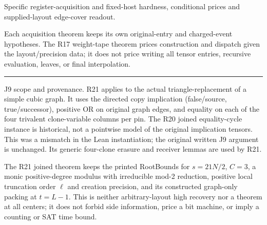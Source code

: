 \documentclass[11pt,a4paper]{article}
\newlength{\OfflineResearchTableWidth}
\newcommand{\OfflineResearchHeaderRule}{\noindent\rule{\linewidth}{0.45pt}\par}
\newcommand{\OfflineResearchRow}{\par}
\newenvironment{OfflineResearchTable}{%
  \par\medskip\begingroup\small\setlength{\parindent}{0pt}%
  \setlength{\parskip}{3pt plus 1pt minus .5pt}%
  \setlength{\OfflineResearchTableWidth}{\linewidth}%
}{%
  \par\endgroup\medskip%
}
\begin{document}
\begin{OfflineResearchTable}
\begin{minipage}[t]{0.31165\OfflineResearchTableWidth}
Specific register-acquisition and fixed-host hardness, conditional prices and supplied-layout edge-cover readout.
\end{minipage}\hfill%
\begin{minipage}[t]{0.49261\OfflineResearchTableWidth}\raggedright
Each acquisition theorem keeps its own original-entry and charged-event hypotheses. The R17 weight-tape theorem prices construction and dispatch given the layout/precision data; it does not price writing all tensor entries, recursive evaluation, leaves, or final interpolation.
\end{minipage}%
\OfflineResearchRow
\OfflineResearchHeaderRule
\end{OfflineResearchTable}

J9 scope and provenance. R21 applies to the actual triangle-replacement of a simple cubic graph. It uses the directed copy implication (false/source, true/successor), positive OR on original graph edges, and equality on each of the four trivalent clone-variable columns per pin. The R20 joined equality-cycle instance is historical, not a pointwise model of the original implication tensors. This was a mismatch in the Lean instantiation; the original written J9 argument is unchanged. Its generic four-clone erasure and receiver lemmas are used by R21.

The R21 joined theorem keeps the printed RootBounds for \(s=21N/2\), \(C=3\), a monic positive-degree modulus with irreducible mod-2 reduction, positive local truncation order \(\ell\) and creation precision, and its constructed graph-only packing at \(t=L-1\). This is neither arbitrary-layout high recovery nor a theorem at all centers; it does not forbid side information, price a bit machine, or imply a counting or SAT time bound.
\end{document}
